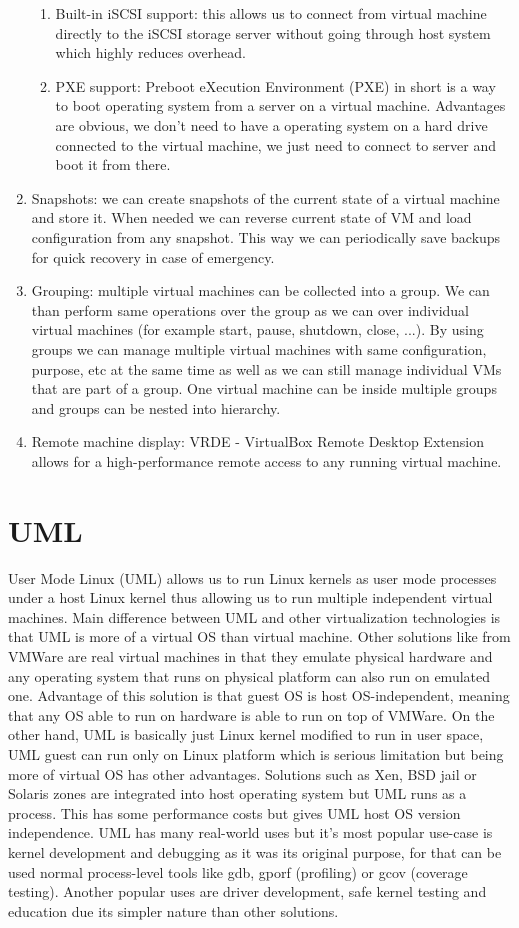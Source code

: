 \begin{enumerate}
\begin{enumerate}
\item Built-in iSCSI support: this allows us to connect from virtual machine directly to the iSCSI storage server without going through host system which
highly reduces overhead.
\item PXE support: Preboot eXecution Environment (PXE) in short is a way to boot operating system from a server on a virtual machine. Advantages are obvious, we don't need to have a operating system on a hard drive connected to the virtual machine, we just need to connect to server and boot it from there.
\end{enumerate}
\item Snapshots: we can create snapshots of the current state of a virtual machine and store it. When needed we can reverse current state of VM and load configuration from any snapshot. This way we can periodically save backups for quick recovery in case of emergency.
\item Grouping: multiple virtual machines can be collected into a group. We can than perform same operations over the group as we can over individual virtual machines (for example start, pause, shutdown, close, ...). By using groups we can manage multiple virtual machines with same configuration, purpose, etc at the same time as well as we can still manage individual VMs that are part of a group. One virtual machine can be inside multiple groups and groups can be nested into hierarchy.
\item Remote machine display: VRDE - VirtualBox Remote Desktop Extension allows for a high-performance remote access to any running virtual machine.
\end{enumerate}


\section{UML \cite{user_mode_linux}}
User Mode Linux (UML) allows us to run Linux kernels as user mode processes under a host Linux kernel thus allowing us to run multiple independent virtual machines. Main difference between UML and other virtualization technologies is that UML is more of a virtual OS than virtual machine. Other solutions like from VMWare are real virtual machines in that they emulate physical hardware and any operating system that runs on physical platform can also run on emulated one. Advantage of this solution is that guest OS is host OS-independent, meaning that any OS able to run on hardware is able to run on top of VMWare. On the other hand, UML is basically just Linux kernel modified to run in user space, UML guest can run only on Linux platform which is serious limitation but being more of virtual OS has other advantages. Solutions such as Xen, BSD jail or Solaris zones are integrated into host operating system but UML runs as a process. This has some performance costs but gives UML host OS version independence. UML has many real-world uses but it's most popular use-case is kernel development and debugging as it was its original purpose, for that can be used normal process-level tools like gdb, gporf (profiling) or gcov (coverage testing). Another popular uses are driver development, safe kernel testing and education due its simpler nature than other solutions.


